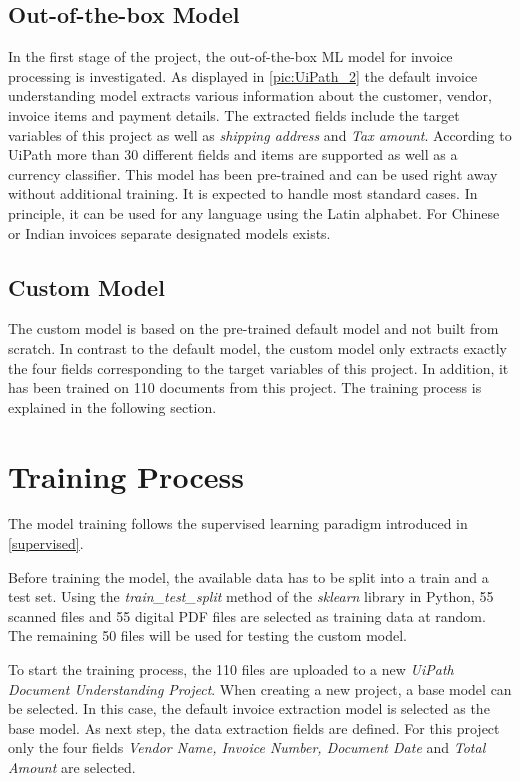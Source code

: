 \subsection*{Out-of-the-box Model}
In the first stage of the project, the out-of-the-box \acf{ML} model for invoice processing is investigated. As displayed in \cref{pic:UiPath_2} the default invoice understanding model extracts various information about the customer, vendor, invoice items and payment details. The extracted fields include the target variables of this project as well as \textit{shipping address} and \textit{Tax amount}. According to UiPath \cite{uipathdoc} more than 30 different fields and items are supported as well as a currency classifier. This model has been pre-trained and can be used right away without additional training. It is expected to handle most standard cases. In principle, it can be used for any language using the Latin alphabet. For Chinese or Indian invoices separate designated models exists.
\subsection*{Custom Model}
The custom model is based on the pre-trained default model and not built from scratch. In contrast to the default model, the custom model only extracts exactly the four fields corresponding to the target variables of this project. In addition, it has been trained on 110 documents from this project. The training process is explained in the following section.

\newpage
\section{Training Process}

The model training follows the supervised learning paradigm introduced in \cref{supervised}.

Before training the model, the available data has to be split into a train and a test set. Using the \textit{train\_test\_split} method of the \textit{sklearn} library in Python, 55 scanned files and 55 digital PDF files are selected as training data at random. The remaining 50 files will be used for testing the custom model.

To start the training process, the 110 files are uploaded to a new \textit{UiPath Document Understanding Project}. When creating a new project, a base model can be selected. In this case, the default invoice extraction model is selected as the base model. As next step, the data extraction fields are defined. For this project only the four fields \textit{Vendor Name, Invoice Number, Document Date} and \textit{Total Amount} are selected.

